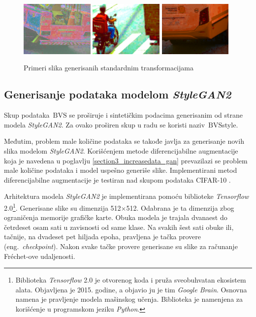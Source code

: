 \documentclass[12pt,oneside]{memoir}
\newcommand{\bvs}{\ensuremath{\,\textrm{BVS}}}
\begin{document}
\begin{figure}[!htbp]
  \includegraphics[width=0.32\textwidth]{matfmaster/glava4/basic_aug/7.jpg}
  \includegraphics[width=0.32\textwidth]{matfmaster/glava4/basic_aug/8.jpg}
  \includegraphics[width=0.32\textwidth]{matfmaster/glava4/basic_aug/9.jpg}
\caption{Primeri slika generisanih standardnim transformacijama}\label{fig:basic_aug}
\end{figure}

 
\subsection{Generisanje podataka modelom \textit{StyleGAN2}}

Skup podataka \bvs{} se proširuje i sintetičkim podacima generisanim od strane modela \textit{StyleGAN2}. Za ovako proširen skup u radu se koristi naziv \bvs{style}. 

Međutim, problem male količine podataka se takođe javlja za generisanje novih slika modelom \textit{StyleGAN2}. Korišćenjem metode diferencijabilne augmentacije koja je navedena u poglavlju \ref{section3_increasedata_gan} prevazilazi se problem male količine podataka i model uspešno generiše slike. Implementirani metod diferencijabilne augmentacije je testiran nad skupom podataka CIFAR-10 \cite{2020diffaugment_report}.

Arhitektura modela \textit{StyleGAN2} je implementirana pomoću biblioteke \textit{Tensorflow} 2.0\footnote{Biblioteka \textit{Tensorflow} 2.0 je otvorenog koda i pruža sveobuhvatan ekosistem alata. Objavljena je 2015. godine, a objavio ju je tim \textit{Google Brain}. Osnovna namena je pravljenje modela mašinskog učenja. Biblioteka je namenjena za korišćenje u programskom jeziku \textit{Python}.}.
Generisane slike su dimenzija 512\(\times\)512. Odabrana je ta dimenzija zbog ograničenja memorije grafičke karte. Obuka modela je trajala dvanaest do četrdeset osam sati u zavisnosti od same klase. Na svakih šest sati obuke ili, tačnije, na dvadeset pet hiljada epoha, pravljena je tačka provere (eng.~\textit{checkpoint}). Nakon svake tačke provere generisane su slike za računanje Fréchet-ove udaljenosti.
\end{document}
